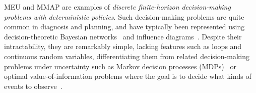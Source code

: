 MEU and MMAP are examples of \emph{discrete finite-horizon decision-making
problems with deterministic policies}.
Such decision-making problems are quite common in diagnosis and
planning, and have typically been represented using decision-theoretic Bayesian networks~\citep[Ch. 16]{russell2016artificial}
and influence
diagrams~\citep{howard2005influence,sanner2010relational}.
Despite their intractability, they are remarkably simple, lacking features such as loops and continuous random variables,
differentiating them from related decision-making problems under uncertainty such as
Markov decision processes (MDPs)~\citep{sutton2018reinforcement} or
optimal value-of-information problems where the goal
is to decide what kinds of events to observe~\citep[\S 16.6]{russell2016artificial}.


